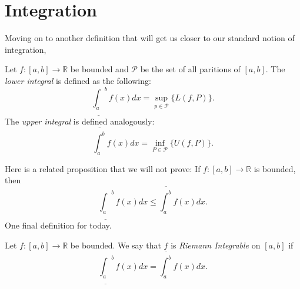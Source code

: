 \documentclass[11pt]{article}
\theoremstyle{definition}
\newcommand{\R}{\mathbb{R}}                      %
\newcommand{\upint}[2]{\overline{\int_{#1}^{#2}}}
\newcommand{\loint}[2]{\underline{\int_{#1}}^{#2}}
\begin{document}
\section{Integration}
Moving on to another definition that will get us closer to our standard notion of integration,
\begin{mdframed}[backgroundcolor = blue!10]
\vspace{+0.2cm}
 Let $f:[a,b]\to \R$ be bounded and $\mathcal{P}$ be the set of all paritions of $[a,b]$. The \textit{lower integral} is defined as the following:
$$
\underline{\int_a}^b f(x)dx = \sup_{p\in\mathcal{P}}\{L(f,P)\}.
$$
The \textit{upper integral} is defined analogously:
$$
\overline{\int_a^b}f(x)dx=\inf_{P\in\mathcal{P}}\{U(f,P)\}.
$$
\end{mdframed}
Here is a related proposition that we will not prove:
\prop If $f:[a,b]\to\R$ is bounded, then
$$
\underline{\int_a}^b f(x)dx\leq\overline{\int_a^b}f(x)dx.
$$
One final definition for today.
\begin{mdframed}[backgroundcolor = blue!10]
\vspace{+0.2cm}
 Let $f:[a,b]\to\R$ be bounded. We say that $f$ is \textit{Riemann Integrable} on $[a,b]$ if
$$
\loint{a}{b} f(x)dx=\upint{a}{b} f(x)dx.
$$
\end{mdframed}
\end{document}
